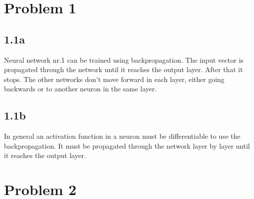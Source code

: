\documentclass{article}
\begin{document}





\section*{Problem 1}
\subsection*{1.1a}
Neural network nr.1 can be trained using backpropagation. The input vector is propagated through the network until it reaches the output layer. After that it stops. The other networks don't move forward in each layer, either going backwards or to another neuron in the same layer.

\subsection*{1.1b}
In general an activation function in a neuron must be differentiable to use the backpropagation. It must be propagated through the network layer by layer until it reaches the output layer.

\section*{Problem 2}
\end{document}
